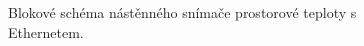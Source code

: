 \begin{figure}[H]
    \centering
    \def\svgwidth{\columnwidth}
    
    \caption[]{Blokové schéma nástěnného snímače prostorové teploty s Ethernetem.}
    \label{fig:blokove-schema-nastenny-snimac-teploty-ethernet}
\end{figure}


